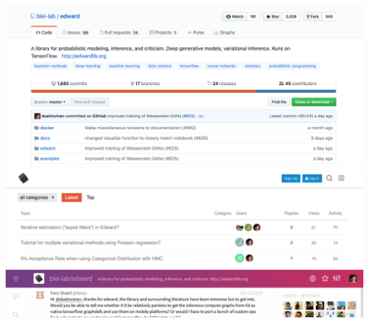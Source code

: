 \documentclass[10pt,
               xcolor={usenames,dvipsnames},
               hyperref={colorlinks,linktoc=all,citecolor=Plum,linkcolor=MidnightBlue,urlcolor=MidnightBlue},noamssymb]{beamer}
\begin{document}
\begin{frame}
\begin{center}
\vspace{-3.5ex}
\includegraphics[width=1.1\textwidth]{img/github.png}
\\[-7ex]
\includegraphics[width=1.0\textwidth]{img/forum.png}
\\[-3ex]
\includegraphics[width=1.0\textwidth]{img/gitter.png}
\\[2ex]
\end{center}
\end{frame}
\end{document}
